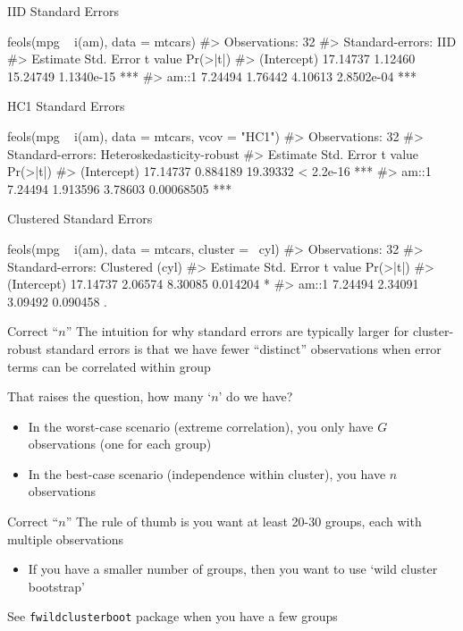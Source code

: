 \documentclass[aspectratio=169,t,11pt,table]{beamer}
\begin{document}
\begin{frame}[fragile]{IID Standard Errors}
  \bigskip
  \begin{codeblock}
feols(mpg ~ i(am), data = mtcars)
#> Observations: 32
#> Standard-errors: IID
#>             Estimate Std. Error  t value   Pr(>|t|)    
#> (Intercept) 17.14737    1.12460 15.24749 1.1340e-15 ***
#> am::1        7.24494    1.76442  4.10613 2.8502e-04 ***
  \end{codeblock}
\end{frame}
\begin{frame}[fragile]{HC1 Standard Errors}
  \bigskip
  \begin{codeblock}
feols(mpg ~ i(am), data = mtcars, vcov = "HC1")
#> Observations: 32
#> Standard-errors: Heteroskedasticity-robust 
#>             Estimate Std. Error  t value   Pr(>|t|)    
#> (Intercept) 17.14737   0.884189 19.39332  < 2.2e-16 ***
#> am::1        7.24494   1.913596  3.78603 0.00068505 ***
  \end{codeblock}
\end{frame}

\begin{frame}[fragile]{Clustered Standard Errors}
  \bigskip
  \begin{codeblock}
feols(mpg ~ i(am), data = mtcars, cluster = ~cyl)
#> Observations: 32
#> Standard-errors: Clustered (cyl) 
#>             Estimate Std. Error t value Pr(>|t|)    
#> (Intercept) 17.14737    2.06574 8.30085 0.014204 *  
#> am::1        7.24494    2.34091 3.09492 0.090458 .  
  \end{codeblock}
\end{frame}

\begin{frame}{Correct ``$n$''}
  The intuition for why standard errors are typically larger for cluster-robust standard errors is that we have fewer ``distinct'' observations when error terms can be correlated within group

  \bigskip
  That raises the question, how many `$n$' do we have?
  \begin{itemize}
    \item In the worst-case scenario (extreme correlation), you only have $G$ observations (one for each group)

    \item In the best-case scenario (independence within cluster), you have $n$ observations
  \end{itemize}
\end{frame}

\begin{frame}{Correct ``$n$''}
  The rule of thumb is you want at least 20-30 groups, each with multiple observations
  \begin{itemize}
    \item If you have a smaller number of groups, then you want to use `wild cluster bootstrap' 
  \end{itemize}

  \bigskip
  See \texttt{fwildclusterboot} package when you have a few groups
\end{frame}
\end{document}
